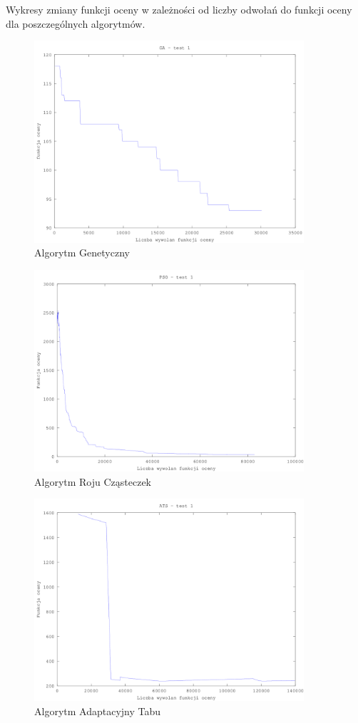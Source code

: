 \par  Wykresy zmiany funkcji oceny w zależności od liczby odwołań do funkcji oceny dla poszczególnych algorytmów. 
\begin{figure}[H]
  \caption{Algorytm Genetyczny}
  \centering
    \includegraphics[width=10cm]{ga_test_1.png}
\end{figure}
\begin{figure}[H]
  \caption{Algorytm Roju Cząsteczek}
  \centering
    \includegraphics[width=10cm]{pso_1.png}
\end{figure}
\begin{figure}[H]
  \caption{Algorytm Adaptacyjny Tabu}
  \centering
    \includegraphics[width=10cm]{ats_test_1.png}
\end{figure}
